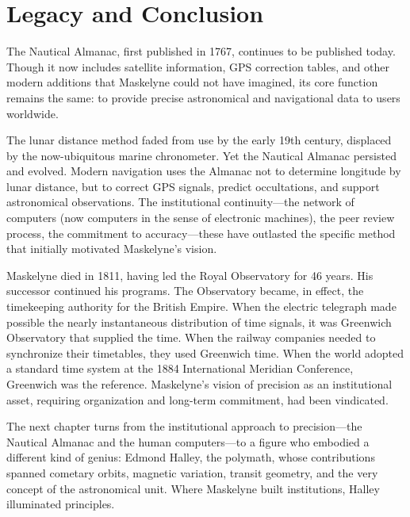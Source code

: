\section{Legacy and Conclusion}

The Nautical Almanac, first published in 1767, continues to be published today. Though it now includes satellite information, GPS correction tables, and other modern additions that Maskelyne could not have imagined, its core function remains the same: to provide precise astronomical and navigational data to users worldwide.

The lunar distance method faded from use by the early 19th century, displaced by the now-ubiquitous marine chronometer. Yet the Nautical Almanac persisted and evolved. Modern navigation uses the Almanac not to determine longitude by lunar distance, but to correct GPS signals, predict occultations, and support astronomical observations. The institutional continuity—the network of computers (now computers in the sense of electronic machines), the peer review process, the commitment to accuracy—these have outlasted the specific method that initially motivated Maskelyne's vision.

Maskelyne died in 1811, having led the Royal Observatory for 46 years. His successor continued his programs. The Observatory became, in effect, the timekeeping authority for the British Empire. When the electric telegraph made possible the nearly instantaneous distribution of time signals, it was Greenwich Observatory that supplied the time. When the railway companies needed to synchronize their timetables, they used Greenwich time. When the world adopted a standard time system at the 1884 International Meridian Conference, Greenwich was the reference. Maskelyne's vision of precision as an institutional asset, requiring organization and long-term commitment, had been vindicated.

The next chapter turns from the institutional approach to precision—the Nautical Almanac and the human computers—to a figure who embodied a different kind of genius: Edmond Halley, the polymath, whose contributions spanned cometary orbits, magnetic variation, transit geometry, and the very concept of the astronomical unit. Where Maskelyne built institutions, Halley illuminated principles.
